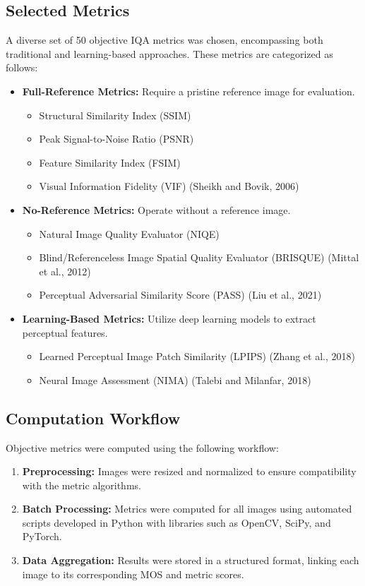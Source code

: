 \subsection{Selected Metrics}

A diverse set of 50 objective IQA metrics was chosen, encompassing both traditional and learning-based approaches. These metrics are categorized as follows:

\begin{itemize}
    \item \textbf{Full-Reference Metrics:} Require a pristine reference image for evaluation.
    \begin{itemize}
        \item Structural Similarity Index (SSIM)
        \item Peak Signal-to-Noise Ratio (PSNR)
        \item Feature Similarity Index (FSIM)
        \item Visual Information Fidelity (VIF) (Sheikh and Bovik, 2006)
    \end{itemize}
    \item \textbf{No-Reference Metrics:} Operate without a reference image.
    \begin{itemize}
        \item Natural Image Quality Evaluator (NIQE)
        \item Blind/Referenceless Image Spatial Quality Evaluator (BRISQUE) (Mittal et al., 2012)
        \item Perceptual Adversarial Similarity Score (PASS) (Liu et al., 2021)
    \end{itemize}
    \item \textbf{Learning-Based Metrics:} Utilize deep learning models to extract perceptual features.
    \begin{itemize}
        \item Learned Perceptual Image Patch Similarity (LPIPS) (Zhang et al., 2018)
        \item Neural Image Assessment (NIMA) (Talebi and Milanfar, 2018)
    \end{itemize}
\end{itemize}

\subsection{Computation Workflow}

Objective metrics were computed using the following workflow:
\begin{enumerate}
    \item \textbf{Preprocessing:} Images were resized and normalized to ensure compatibility with the metric algorithms.
    \item \textbf{Batch Processing:} Metrics were computed for all images using automated scripts developed in Python with libraries such as OpenCV, SciPy, and PyTorch.
    \item \textbf{Data Aggregation:} Results were stored in a structured format, linking each image to its corresponding MOS and metric scores.
\end{enumerate}

